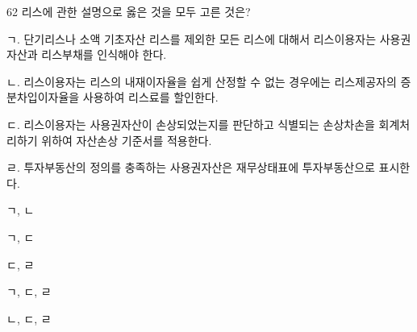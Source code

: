 \begin{question}{62}
리스에 관한 설명으로 옳은 것을 모두 고른 것은?
\begin{framedtext}
ㄱ. 단기리스나 소액 기초자산 리스를 제외한 모든 리스에 대해서 리스이용자는 사용권자산과 리스부채를 인식해야 한다. \par
ㄴ. 리스이용자는 리스의 내재이자율을 쉽게 산정할 수 없는 경우에는 리스제공자의 증분차입이자율을 사용하여 리스료를 할인한다. \par
ㄷ. 리스이용자는 사용권자산이 손상되었는지를 판단하고 식별되는 손상차손을 회계처리하기 위하여 자산손상 기준서를 적용한다. \par
ㄹ. 투자부동산의 정의를 충족하는 사용권자산은 재무상태표에 투자부동산으로 표시한다. \par
\end{framedtext}
\begin{choices}
  \item ㄱ, ㄴ
  \item ㄱ, ㄷ
  \item ㄷ, ㄹ
  \item ㄱ, ㄷ, ㄹ
  \item ㄴ, ㄷ, ㄹ
\end{choices}
\end{question}
